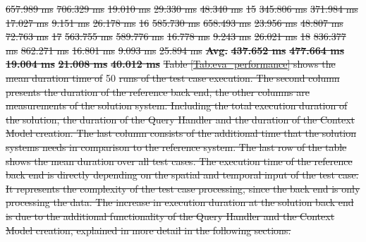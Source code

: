 \documentclass[draft,final]{vutinfth} %
\providecommand{\DIFaddtex}[1]{{\protect\color{blue}\uwave{#1}}} %
\providecommand{\DIFdeltex}[1]{{\protect\color{red}\sout{#1}}}                      %
\providecommand{\DIFaddbegin}{} %
\providecommand{\DIFaddend}{} %
\providecommand{\DIFdelbegin}{} %
\providecommand{\DIFdelend}{} %
\providecommand{\DIFdelFL}[1]{\DIFdel{#1}} %
\providecommand{\DIFadd}[1]{\texorpdfstring{\DIFaddtex{#1}}{#1}} %
\providecommand{\DIFdel}[1]{\texorpdfstring{\DIFdeltex{#1}}{}} %
\begin{document}
\DIFdelFL{657.989 ms }%
\DIFdelFL{706.329 ms }%
\DIFdelFL{19.010 ms }%
\DIFdelFL{29.330 ms }%
\DIFdelFL{48.340 ms  }%
\DIFdelFL{15 }%
\DIFdelFL{345.806 ms }%
\DIFdelFL{371.984 ms }%
\DIFdelFL{17.027 ms }%
\DIFdelFL{9.151 ms }%
\DIFdelFL{26.178 ms }%
\DIFdelFL{16 }%
\DIFdelFL{585.730 ms }%
\DIFdelFL{658.493 ms }%
\DIFdelFL{23.956 ms }%
\DIFdelFL{48.807 ms }%
\DIFdelFL{72.763 ms }%
\DIFdelFL{17 }%
\DIFdelFL{563.755 ms }%
\DIFdelFL{589.776 ms }%
\DIFdelFL{16.778 ms }%
\DIFdelFL{9.243 ms }%
\DIFdelFL{26.021 ms }%
\DIFdelFL{18 }%
\DIFdelFL{836.377 ms }%
\DIFdelFL{862.271 ms }%
\DIFdelFL{16.801 ms }%
\DIFdelFL{9.093 ms }%
\DIFdelFL{25.894 ms }%
\textbf{\DIFdelFL{Avg.}} %
\textbf{\DIFdelFL{437.652 ms}} %
\textbf{\DIFdelFL{477.664 ms}} %
\textbf{\DIFdelFL{19.004 ms}} %
\textbf{\DIFdelFL{21.008 ms}} %
\textbf{\DIFdelFL{40.012 ms}} %
\DIFdel{Table \ref{Tab:eva_performance} shows the mean duration time of }\DIFdelend \DIFaddbegin \DIFadd{Every test case is executed }\DIFaddend 50 \DIFdelbegin \DIFdel{runs of the test case execution. The second column presents the duration of the reference back end, the other columns are measurements of the solution system. Including the total execution duration of the solution, the duration of the Query Handler and the duration of the Context Model creation. The last column consists of the additional time that the solution systems needs in comparison to the reference system. The last row of the table shows the mean duration over all test cases.
The execution time of the reference back end is directly depending on the spatial and temporal input of the test case. It represents the complexity of the test case processing, since the back end is only processing the data. The increase in execution duration at the solution back end is due to the additional functionality of the Query Handler and the Context Model creation, explained in more detail in the following sections. 
}%
\end{document}
